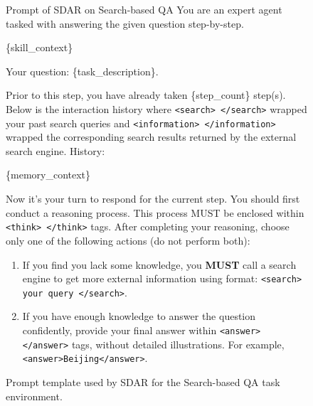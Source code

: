 \documentclass{article} %
\newcommand{\methodname}{\textsc{SDAR}\xspace}
\begin{document}
\begin{figure}[h]
\centering
\begin{templatebox}{Prompt of \methodname on Search-based QA}
You are an expert agent tasked with answering the given question step-by-step.

\{skill\_context\}

Your question: \{task\_description\}.

Prior to this step, you have already taken \{step\_count\} step(s). Below is the interaction history where \texttt{<search> </search>} wrapped your past search queries and \texttt{<information> </information>} wrapped the corresponding search results returned by the external search engine. History:

\{memory\_context\}

Now it's your turn to respond for the current step.
You should first conduct a reasoning process. This process MUST be enclosed within \texttt{<think> </think>} tags.
After completing your reasoning, choose only one of the following actions (do not perform both):
\begin{enumerate}
    \item If you find you lack some knowledge, you \textbf{MUST} call a search engine to get more external information using format: \texttt{<search> your query </search>}.
    \item If you have enough knowledge to answer the question confidently, provide your final answer within \texttt{<answer> </answer>} tags, without detailed illustrations. For example, \texttt{<answer>Beijing</answer>}.
\end{enumerate}
\end{templatebox}
\caption{Prompt template used by \methodname{} for the Search-based QA task environment.}
\label{fig:prompt_searchqa}
\end{figure}
\end{document}
